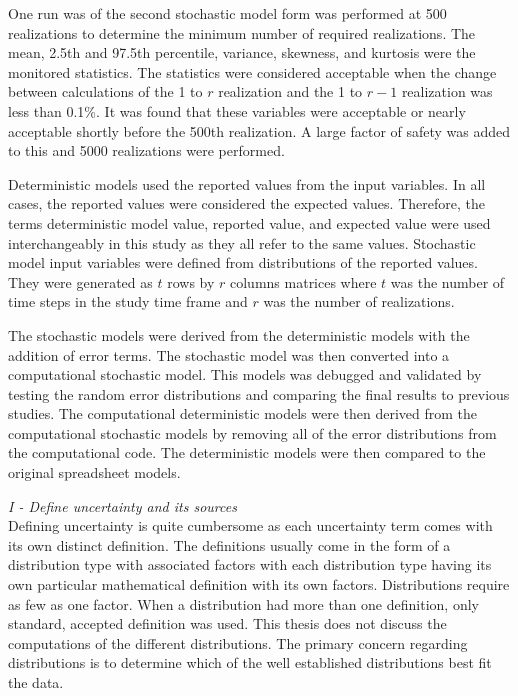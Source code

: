\begin{linenumbers}
One run was of the second stochastic model form was performed at 500 realizations to determine the minimum number of required realizations.  The mean, 2.5th and 97.5th percentile, variance, skewness, and kurtosis were the monitored statistics.  The statistics were considered acceptable when the change between calculations of the 1 to $r$ realization and the 1 to $r-1$ realization was less than 0.1\%.  It was found that these variables were acceptable or nearly acceptable shortly before the 500th realization.  A large factor of safety was added to this and 5000 realizations were performed.

Deterministic models used the reported values from the input variables.  In all cases, the reported values were considered the expected values.  Therefore, the terms deterministic model value, reported value, and expected value were used interchangeably in this study as they all refer to the same values.  Stochastic model input variables were defined from distributions of the reported values.  They were generated as $t$ rows by $r$ columns matrices where $t$ was the number of time steps in the study time frame and $r$ was the number of realizations.

The stochastic models were derived from the deterministic models with the addition of error terms.  The stochastic model was then converted into a computational stochastic model.  This models was debugged and validated by testing the random error distributions and comparing the final results to previous studies.  The computational deterministic models were then derived from the computational stochastic models by removing all of the error distributions from the computational code.  The deterministic models were then compared to the original spreadsheet models.

\emph{I - Define  uncertainty and its sources}\\
Defining uncertainty is quite cumbersome as each uncertainty term comes with its own distinct definition.  The definitions usually come in the form of a distribution type with associated factors with each distribution type having its own particular mathematical definition with its own factors.  Distributions require as few as one factor.  When a distribution had more than one definition, only standard, accepted definition was used.  This thesis does not discuss the computations of the different distributions.  The primary concern regarding distributions is to determine which of the well established distributions best fit the data.


\end{linenumbers}
